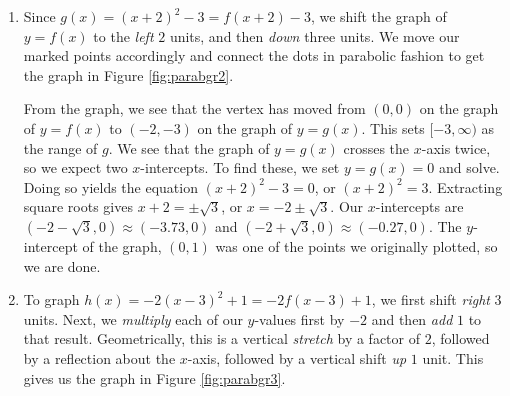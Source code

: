{
\begin{enumerate}


\item  Since $g(x) = (x+2)^2 - 3 = f(x+2) - 3$, we shift the graph of $y = f(x)$ to the \textit{left} $2$ units, and then \textit{down} three units. We move our marked points accordingly and connect the dots in parabolic fashion to get the graph in Figure \ref{fig:parabgr2}.


From the graph, we see that the vertex has moved from $(0,0)$ on the graph of $y = f(x)$ to $(-2,-3)$ on the graph of $y = g(x)$.  This sets $[-3, \infty)$ as the range of $g$.  We see that the graph of $y=g(x)$ crosses the $x$-axis twice, so we expect two $x$-intercepts.  To find these, we set $y = g(x) = 0$ and solve.  Doing so yields the equation $(x+2)^2 - 3 = 0$, or $(x+2)^2 = 3$.  Extracting square roots gives $x + 2 = \pm \sqrt{3}$, or $x = -2 \pm \sqrt{3}$.  Our $x$-intercepts are $(-2-\sqrt{3}, 0) \approx (-3.73, 0)$ and $(-2+\sqrt{3}, 0) \approx (-0.27, 0)$.  The $y$-intercept of the graph, $(0,1)$ was one of the points we originally plotted, so we are done.


\item  To graph  $h(x) = -2(x-3)^2+1 = -2f(x-3)+1$, we first shift \textit{right} $3$ units.  Next, we \textit{multiply} each of our $y$-values first by $-2$ and then \textit{add} $1$ to that result.  Geometrically, this is a vertical \textit{stretch} by a factor of $2$, followed by a reflection about the $x$-axis, followed by a vertical shift \textit{up} $1$ unit.  This gives us the graph in Figure \ref{fig:parabgr3}.


\end{enumerate}}
